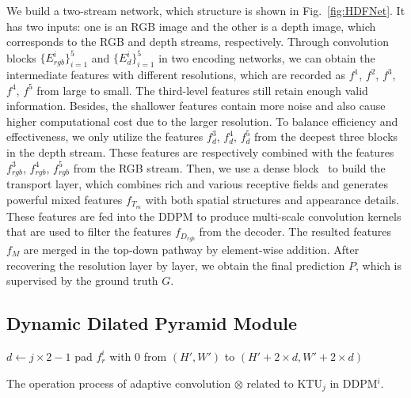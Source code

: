 \documentclass[runningheads]{llncs}
\begin{document}
We build a two-stream network, which structure is shown in Fig.~\ref{fig:HDFNet}. It has two inputs: one is an RGB image and the other is a depth image, which corresponds to the RGB and depth streams, respectively.
Through convolution blocks $\{E^i_{rgb}\}^{5}_{i=1}$ and $\{E^i_{d}\}^{5}_{i=1}$ in two encoding networks, we can obtain the intermediate features with different resolutions, which are recorded as $f^{1}$, $f^{2}$, $f^{3}$, $f^{4}$, $f^{5}$ from large to small.
The third-level features still retain enough valid information. Besides, the shallower features contain more noise and also cause higher computational cost due to the larger resolution.
To balance efficiency and effectiveness, we only utilize the features $f^{3}_{d}$, $f^{4}_{d}$, $f^{5}_{d}$ from the deepest three blocks in the depth stream. These features are respectively combined with the features $f^{3}_{rgb}$, $f^{4}_{rgb}$, $f^{5}_{rgb}$ from the RGB stream.
Then, we use a dense block~\cite{DenseNet} to build the transport layer, which combines rich and various receptive fields and generates powerful mixed features $f_{T_m}$ with both spatial structures and appearance details.
These features are fed into the DDPM to produce multi-scale convolution kernels that are used to filter the features $f_{D_{rgb}}$ from the decoder. The resulted features $f_{M}$ are merged in the top-down pathway by element-wise addition. After recovering the resolution layer by layer, we obtain the final prediction $P$, which is supervised by the ground truth $G$.

\subsection{Dynamic Dilated Pyramid Module}

\begin{algorithm}[t]
 $d \leftarrow j \times 2 - 1$\;
 pad $f^i_{r}$ with $0$ from $(H', W')$ to $(H' + 2 \times d, W' + 2 \times d)$\;
 \caption{The operation process of adaptive convolution $\otimes$ related to KTU$_j$ in DDPM$^i$.}
 \label{alg:conv}
\end{algorithm}
\end{document}
